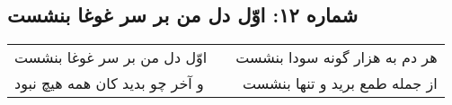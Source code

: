 \begin{center}
\section*{شماره ۱۲: اوّل دل من بر سر غوغا بنشست}
\label{sec:012}
\begin{longtable}{l p{0.5cm} r}
اوّل دل من بر سر غوغا بنشست
&&
هر دم به هزار گونه سودا بنشست
\\
و آخر چو بدید کان همه هیچ نبود
&&
از جمله طمع برید و تنها بنشست
\\
\end{longtable}
\end{center}
